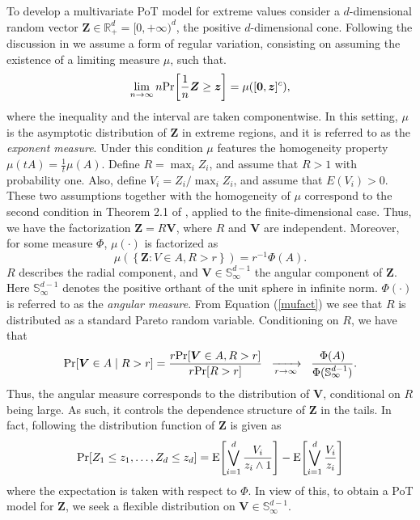 To develop a multivariate PoT model for extreme values consider a $d$-dimensional random vector $\bm{Z} \in {\mathbb R}^d_+ = [0,+\infty)^d$, the positive $d$-dimensional cone. Following the discussion in \cite{goix2017} we assume a form of regular variation, consisting on assuming the existence of a limiting measure $\mu$, such that.
\[
    \lim\limits_{n\to\infty}n\prob{\frac{1}{n}\bm{Z}\geq \bm{z}} = \mu\left([\bm{0},\bm{z}]^c\right),
\]
where the inequality and the interval are taken componentwise. 
In this setting, $\mu$ is the asymptotic distribution of $\bm{Z}$ in extreme regions, and it is referred to as the
  \emph{exponent measure}. Under this condition $\mu$ features the homogeneity property $\mu(tA) = \frac{1}{t}\mu(A)$. 
Define  $R = \max_{i} Z_i$, and assume that $R>1$ with probability one. Also, define $V_i = Z_i/\max_i Z_i$, and assume that $E(V_i)>0$.
These two assumptions together with the homogeneity of $\mu$ correspond to the second condition in Theorem 2.1 of
\cite{ferreira2014}, applied to the finite-dimensional case.
Thus, we have the factorization $\bm{Z} =  R\bm{V}$, where $R$ and $\bm{V}$  are independent. Moreover,
for some measure $\Phi$, $\mu(\cdot)$ is factorized as
\begin{equation}\label{mufact}
    \mu\left( \left\lbrace\bm{Z} : V \in A , R > r\right\rbrace \right) = r^{-1}\Phi(A).
\end{equation}
$R$ describes the radial component, and $\bm{V} \in {\mathbb S}_{\infty}^{d-1}$ the 
angular component of $\bm{Z}$.  Here ${\mathbb S}_\infty^{d-1}$ denotes the positive
orthant of the unit sphere in infinite norm.  $\Phi(\cdot)$ is referred to as the \emph{angular measure}.   
From Equation (\ref{mufact}) we see that $R$ is distributed as a standard Pareto random variable. Conditioning on $R$, we have that
\begin{equation} \label{MGP}
    \prob{\bm{V} \in A \mid R > r} = \frac{r\prob{\bm{V} \in A, R > r}}{r\prob{R > r}}\hspace{0.2cm}
      \xrightarrow[r\to\infty]{~} \hspace{0.2cm} \frac{\Phi(A)}{\Phi({\mathbb S}_{\infty}^{d-1})}.
\end{equation}
 Thus, the angular measure corresponds to the distribution of $\bm{V}$, conditional on $R$ being large.
 As such, it controls the dependence structure of $\bm{Z}$ in the tails. In fact, following \cite{ferreira2014} the distribution function of $\bm{Z}$ is given as
\begin{equation*}
    \prob{Z_1\leq z_1, \ldots ,Z_d\leq z_d} = \expect{\bigvee_{i=1}^d
\frac{V_i}{z_i\wedge 1}} - \expect{\bigvee_{i=1}^d
\frac{V_i}{z_i}}
\end{equation*}
where the expectation is taken with respect to $\Phi$.
In view of this, to obtain a PoT model for $\bm{Z}$, we seek 
a flexible distribution on $\bm{V} \in {\mathbb S}_{\infty}^{d-1}$.

